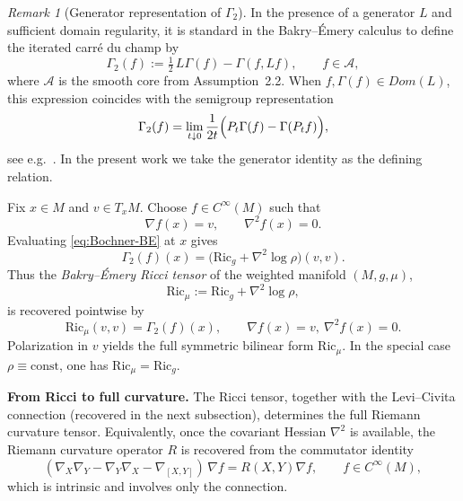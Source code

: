 \documentclass[11pt]{amsart}
\theoremstyle{definition}
\theoremstyle{remark}
\newtheorem{remark}[theorem]{Remark}
\newcommand{\Dom}{Dom}
\begin{document}
\begin{remark}[Generator representation of $\Gamma_2$]
In the presence of a generator $L$ and sufficient domain regularity, it is standard in the
Bakry--\'Emery calculus to define the iterated carr\'e du champ by
\[
\Gamma_2(f) := \tfrac12\,L\Gamma(f) - \Gamma(f,Lf),
\qquad f\in\mathcal A,
\]
where $\mathcal A$ is the smooth core from Assumption~2.2.
When $f,\Gamma(f)\in\Dom(L)$, this expression coincides with the semigroup representation
\[
\Gamma_2(f)
= \lim_{t\downarrow0}\frac{1}{2t}\Bigl(P_t\Gamma(f)-\Gamma(P_tf)\Bigr),
\]
see e.g.\ \cite[Chapter~3]{BakryGentilLedoux2014}.
In the present work we take the generator identity as the defining relation.
\end{remark}


Fix $x\in M$ and $v\in T_xM$.
Choose $f\in C^\infty(M)$ such that
\[
\nabla f(x)=v,
\qquad
\nabla^2 f(x)=0.
\]
Evaluating \eqref{eq:Bochner-BE} at $x$ gives
\[
\Gamma_2(f)(x)
=
\big(\mathrm{Ric}_g+\nabla^2\log\rho\big)(v,v).
\]
Thus the \emph{Bakry--\'Emery Ricci tensor} of the weighted manifold $(M,g,\mu)$,
\[
\mathrm{Ric}_\mu:=\mathrm{Ric}_g+\nabla^2\log\rho,
\]
is recovered pointwise by
\begin{equation}\label{eq:Ricmu-recovery}
\mathrm{Ric}_\mu(v,v)=\Gamma_2(f)(x),
\qquad
\nabla f(x)=v,\ \nabla^2 f(x)=0.
\end{equation}
Polarization in $v$ yields the full symmetric bilinear form $\mathrm{Ric}_\mu$.
In the special case $\rho\equiv\mathrm{const}$, one has $\mathrm{Ric}_\mu=\mathrm{Ric}_g$.

\medskip
\noindent\textbf{From Ricci to full curvature.}
The Ricci tensor, together with the Levi--Civita connection (recovered in the next subsection),
determines the full Riemann curvature tensor.
Equivalently, once the covariant Hessian $\nabla^2$ is available, the Riemann curvature operator
$R$ is recovered from the commutator identity
\[
(\nabla_X\nabla_Y - \nabla_Y\nabla_X - \nabla_{[X,Y]})\,\nabla f
=
R(X,Y)\nabla f,
\qquad
f\in C^\infty(M),
\]
which is intrinsic and involves only the connection.
\end{document}
